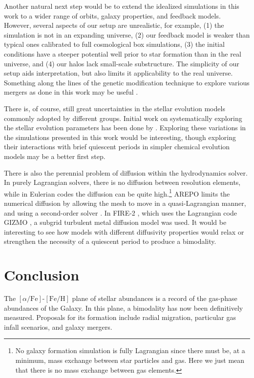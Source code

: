 \documentclass[twocolumn,linenumbers,trackchanges]{aastex631}
\newcommand{\FeH}{\ensuremath{[\textrm{Fe}/\textrm{H}]}}
\newcommand{\alphaFe}{\ensuremath{[\alpha/\textrm{Fe}]}}
\begin{document}
Another natural next step would be to extend the idealized simulations in this work to a wider range of orbits, galaxy properties, and feedback models. However, several aspects of our setup are unrealistic, for example, (1) the simulation is not in an expanding universe, (2) our feedback model is weaker than typical ones calibrated to full cosmological box simulations, (3) the initial conditions have a steeper potential well prior to star formation than in the real universe, and (4) our halos lack small-scale substructure. The simplicity of our setup aids interpretation, but also limits it applicability to the real universe. Something along the lines of the genetic modification technique to explore various mergers as done in this work may be useful \citep{2016MNRAS.455..974R,2017MNRAS.465..547P}.

There is, of course, still great uncertainties in the stellar evolution models commonly adopted by different groups. Initial work on systematically exploring the stellar evolution parameters has been done by \citet{2017A&A...605A..59R,2021MNRAS.508.3365B}. Exploring these variations in the simulations presented in this work would be interesting, though exploring their interactions with brief quiescent periods in simpler chemical evolution models may be a better first step.

There is also the perennial problem of diffusion within the hydrodynamics solver. In purely Lagrangian solvers, there is no diffusion between resolution elements, while in Eulerian codes the diffusion can be quite high.\footnote{No galaxy formation simulation is fully Lagrangian since there must be, at a minimum, mass exchange between star particles and gas. Here we just mean that there is no mass exchange between gas elements.} AREPO limits the numerical diffusion by allowing the mesh to move in a quasi-Lagrangian manner, and using a second-order solver \citep{2010MNRAS.401..791S}. In FIRE-2 \citep{2018MNRAS.480..800H}, which uses the Lagrangian code GIZMO \citep{2015MNRAS.450...53H}, a subgrid turbulent metal diffusion model was used. It would be interesting to see how models with different diffusivity properties would relax or strengthen the necessity of a quiescent period to produce a bimodality.

\section{Conclusion}\label{sec:conclusion}
The \alphaFe{}-\FeH{} plane of stellar abundances is a record of the gas-phase abundances of the Galaxy. In this plane, a bimodality has now been definitively measured. Proposals for its formation include radial migration, particular gas infall scenarios, and galaxy mergers.
\end{document}
